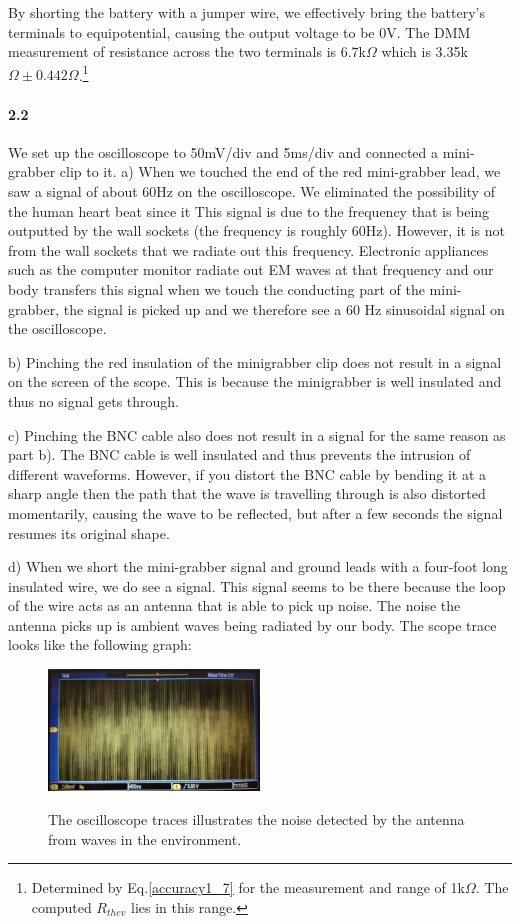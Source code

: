 \documentclass[authoryear, 12pt,5p, times]{elsarticle}
\begin{document}
By shorting the battery with a jumper wire, we effectively bring the battery's terminals to equipotential, causing the output voltage to be 0V. The DMM measurement of resistance across the two terminals is 6.7k$\Omega$ which is 3.35k$\Omega\pm 0.442\Omega$.\footnote{Determined  by Eq.\ref{accuracy1_7} for the measurement and range of 1k$\Omega$. The computed $R_{thev}$ lies in this range.}
\paragraph{\textbf{2.2}}
 We set up the oscilloscope to 50mV/div and 5ms/div and connected a mini-grabber clip to it.
a) When we touched the end of the red mini-grabber lead, we saw a signal of about 60Hz on the oscilloscope. We eliminated the possibility of the human heart beat since it This signal is due to the frequency that is being outputted by the wall sockets (the frequency is roughly 60Hz). However, it is not from the wall sockets that we radiate out this frequency. Electronic appliances such as the computer monitor radiate out EM waves at that frequency and our body transfers this signal when we touch the conducting part of the mini-grabber, the signal is picked up and we therefore see a 60 Hz sinusoidal signal on the oscilloscope.
\par b) Pinching the red insulation of the minigrabber clip does not result in a signal on the screen of the scope. This is because the minigrabber is well insulated and thus no signal gets through.
\par c) Pinching the BNC cable also does not result in a signal for the same reason as part b). The BNC cable is well insulated and thus prevents the intrusion of different waveforms. However, if you distort the BNC cable by bending it at a sharp angle then the path that the wave is travelling through is also distorted momentarily, causing the wave to be reflected, but after a few seconds the signal resumes its original shape.

d) When we short the mini-grabber signal and ground leads with a four-foot long insulated wire, we do see a signal. This signal seems to be there because the loop of the wire acts as an antenna that is able to pick up noise. The noise the antenna picks up is ambient waves being radiated by our body. The scope trace looks like the following graph:
\begin{figure}[h!]
\includegraphics[width=0.5\textwidth]{figure/trace_2_2e}
\label{trace2.2e}
\caption{The oscilloscope traces illustrates the noise detected by the antenna from waves in the environment.}
\end{figure}
\end{document}
